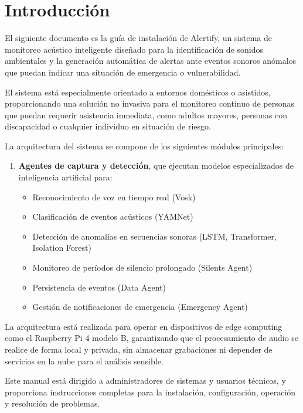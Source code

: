 
\section*{Introducción}

El siguiente documento es la guía de instalación de Alertify, un sistema de monitoreo acústico inteligente diseñado para la identificación de sonidos ambientales y la generación automática de alertas ante eventos sonoros anómalos que puedan indicar una situación de emergencia o vulnerabilidad.

El sistema está especialmente orientado a entornos domésticos o asistidos, proporcionando una solución no invasiva para el monitoreo continuo de personas que puedan requerir asistencia inmediata, como adultos mayores, personas con discapacidad o cualquier individuo en situación de riesgo.

La arquitectura del sistema se compone de los siguientes módulos principales:

\begin{enumerate}
  \item \textbf{Agentes de captura y detección}, que ejecutan modelos especializados de inteligencia artificial para:
        \begin{itemize}
          \item Reconocimiento de voz en tiempo real (Vosk)
          \item Clasificación de eventos acústicos (YAMNet)
          \item Detección de anomalías en secuencias sonoras (LSTM, Transformer, Isolation Forest)
          \item Monitoreo de períodos de silencio prolongado (Silents Agent)
          \item Persistencia de eventos (Data Agent)
          \item Gestión de notificaciones de emergencia (Emergency Agent)
        \end{itemize}
\end{enumerate}

La arquitectura está realizada para operar en dispositivos de edge computing como el Raspberry Pi 4 modelo B, garantizando que el procesamiento de audio se realice de forma local y privada, sin almacenar grabaciones ni depender de servicios en la nube para el análisis sensible.

Este manual está dirigido a administradores de sistemas y usuarios técnicos, y proporciona instrucciones completas para la instalación, configuración, operación y resolución de problemas.

